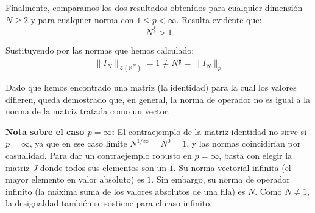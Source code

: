 {    Finalmente, comparamos los dos resultados obtenidos para cualquier dimensión $N \geq 2$ y para cualquier norma con $1 \leq p < \infty$. Resulta evidente que:
    $$ N^{\frac{1}{p}} > 1 $$

    Sustituyendo por las normas que hemos calculado:
    $$ \|I_N\|_{\mathcal{L}(\mathbb{K}^N)} = 1 \neq N^{\frac{1}{p}} = \|I_N\|_p $$

    Dado que hemos encontrado una matriz (la identidad) para la cual los valores difieren, queda demostrado que, en general, la norma de operador no es igual a la norma de la matriz tratada como un vector.

    \vspace{0.3cm}
    \textbf{Nota sobre el caso $p = \infty$:} El contraejemplo de la matriz identidad no sirve si $p = \infty$, ya que en ese caso límite $N^{1/\infty} = N^0 = 1$, y las normas coincidirían por casualidad. Para dar un contraejemplo robusto en $p = \infty$, basta con elegir la matriz $J$ donde todos sus elementos son un $1$. Su norma vectorial infinita (el mayor elemento en valor absoluto) es $1$. Sin embargo, su norma de operador infinito (la máxima suma de los valores absolutos de una fila) es $N$. Como $N \neq 1$, la desigualdad también se sostiene para el caso infinito.
}


